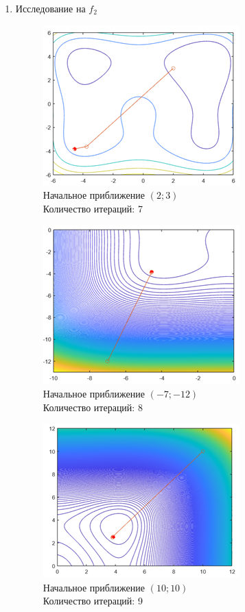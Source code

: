 \documentclass[12pt]{article}
\begin{document}
\begin{enumerate}
	\item Исследование на $f_2$

		\begin{figure}[H]
    	\centering
    	\includegraphics[]{img/f2_3_1.png}
    	\\ Начальное приближение $\left( 2; 3 \right)$
    	\\ Количество итераций: 7
    \end{figure}

	\begin{figure}[H]
    	\centering
    	\includegraphics[]{img/f2_3_2.png}
    	\\ Начальное приближение $\left( -7; -12 \right)$
    	\\ Количество итераций: 8
    \end{figure}

	\begin{figure}[H]
    	\centering
    	\includegraphics[]{img/f2_3_3.png}
    	\\ Начальное приближение $\left( 10; 10 \right)$
    	\\ Количество итераций: 9
    \end{figure}


\end{enumerate}
\end{document}
